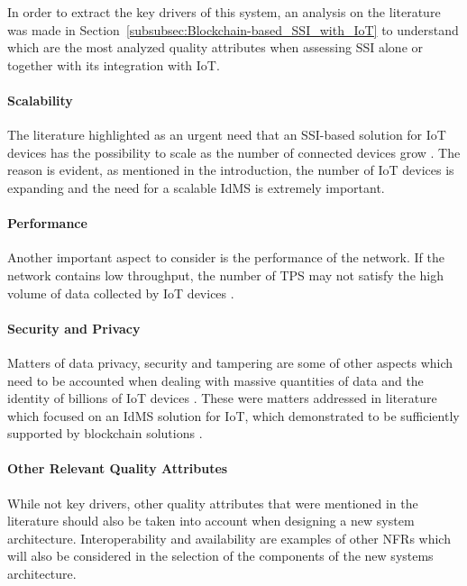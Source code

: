 In order to extract the key drivers of this system, an analysis on the literature was made in Section~\ref{subsubsec:Blockchain-based_SSI_with_IoT} to understand which are the most analyzed quality attributes when assessing SSI alone or together with its integration with IoT.

\paragraph{Scalability}

The literature highlighted as an urgent need that an SSI-based solution for IoT devices has the possibility to scale as the number of connected devices grow \cite{luecking2020decentralized} \cite{zhu2018identity} \cite{lo2019analysis} \cite{zhu2017autonomic}. The reason is evident, as mentioned in the introduction, the number of IoT devices is expanding and the need for a scalable IdMS is extremely important.

\paragraph{Performance}

Another important aspect to consider is the performance of the network. If the network contains low throughput, the number of \acrfull{TPS} may not satisfy the high volume of data collected by IoT devices \cite{lo2019analysis}. 

\paragraph{Security and Privacy}

Matters of data privacy, security and tampering are some of other aspects which need to be accounted when dealing with massive quantities of data and the identity of billions of IoT devices \cite{luecking2020decentralized} \cite{zhu2018identity} \cite{s18082575} \cite{theodouli2020towards}. These were matters addressed in literature which focused on an IdMS solution for IoT, which demonstrated to be sufficiently supported by blockchain solutions \cite{lo2019analysis}.

\paragraph{Other Relevant Quality Attributes}

While not key drivers, other quality attributes that were mentioned in the literature should also be taken into account when designing a new system architecture. Interoperability \cite{luecking2020decentralized} \cite{zhu2018identity} and availability \cite{theodouli2020towards} are examples of other NFRs which will also be considered in the selection of the components of the new systems architecture.

